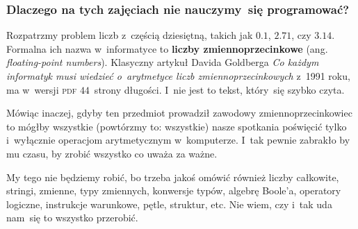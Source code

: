 \documentclass[10pt,t]{beamer}
\begin{document}
\begin{frame}
  \frametitle{Dlaczego na tych zajęciach nie nauczymy~się
    programować?}


  Rozpatrzmy problem liczb z~częścią dziesiętną, takich jak $0.1$, $2.71$,
  czy $3.14$. Formalna ich nazwa w~informatyce to \textbf{liczby
    zmiennoprzecinkowe} (ang. \textit{floating-point numbers}). Klasyczny
  artykuł Davida Goldberga
  {\textit{Co każdym informatyk musi wiedzieć o~arytmetyce liczb
      zmiennoprzecinkowych}} z~1991 roku, ma w~wersji \textsc{pdf}
  $44$~strony długości. I~nie jest to tekst, który~się szybko czyta.

  Mówiąc inaczej, gdyby ten przedmiot prowadził zawodowy
  zmiennoprzecinkowiec to mógłby \alert{wszystkie} (powtórzmy to:
  wszystkie) nasze spotkania poświęcić tylko i~wyłącznie operacjom
  arytmetycznym w~komputerze. I~tak pewnie zabrakło by mu czasu, by zrobić
  wszystko co uważa za ważne.

  My tego nie będziemy robić, bo trzeba jakoś omówić również liczby
  całkowite, stringi, zmienne, typy zmiennych, konwersje typów, algebrę
  Boole’a, operatory logiczne, instrukcje warunkowe, pętle, struktur, etc.
  Nie wiem, czy i~tak uda nam~się to wszystko przerobić.

\end{frame}
\end{document}
